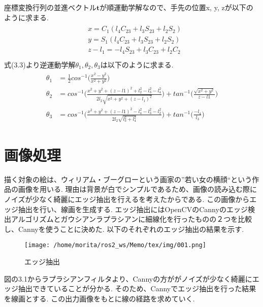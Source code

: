 	座標変換行列の並進ベクトル$\boldsymbol{t}$が順運動学解なので、手先の位置x, y, zが以下のように求まる.
	\begin{equation}
			\begin{array}{c}
			\begin{split}
				& x = C_1(l_4C_{23} + l_3S_{23} + l_2S_2) \\
				& y = S_1(l_4C_{23} + l_3S_{23} + l_2S_2) \\
				& z - l_1 = -l_4S_{23} + l_3C_{23} + l_2C_2 \\
			\end{split}
		\end{array}
	\end{equation}
	式(3.3)より逆運動学解$\theta_1, \theta_2, \theta_3$は以下のように求まる.
	\begin{equation}
			\begin{array}{c}
			\begin{split}
				\theta_1  &  =\frac{1}{2}  cos^{-1}\biggl( \frac{x^2-y^2}{x^2+y^2} \biggr) \\
				\theta_2 & = cos^{-1}\biggl( \frac{x^2+y^2+(z-l1)^2 + l_2^2-l_3^2-l_4^2}{2l_2\sqrt{x^2+y^2+(z-l_1)^2}} \biggr) + tan^{-1}\biggl( \frac{\sqrt{x^2+y^2}}{z-l1}\biggr) \\
				\theta_3 & =cos^{-1}\biggl( \frac{x^2+y^2+(z-l1)^2 - l_4^2-l_3^2-l_2^2}{2l_2\sqrt{l_3^2+l_4^2}}\biggr) + tan^{-1}\biggl( \frac{-l_4}{l_3}\biggr)
			\end{split}
			\end{array}
	\end{equation}
	\section{画像処理}
	描く対象の絵は、ウィリアム・ブーグローという画家の''若い女の横顔``という作品の画像を用いる. 理由は背景が白でシンプルであるため、画像の読み込む際にノイズが少なく綺麗にエッジ抽出を行えるを考えたからである. この画像からエッジ抽出を行い、線画を生成する. エッジ抽出にはOpenCVのCannyのエッジ検出アルゴリズムとガウシアンラプラシアンに細線化を行ったものの２つを比較し、Cannyを使うことに決めた. 以下のそれぞれのエッジ抽出の結果を示す. 
	 \begin{center}
        \begin{figure}[h]
            \texttt{[image: /home/morita/ros2\_ws/Memo/tex/img/001.png]}
            \caption{エッジ抽出}
            \label{manipulator}
        \end{figure}
    \end{center}
	図の3.1からラプラシアンフィルタより、Cannyの方ががノイズが少なく綺麗にエッジ抽出できていることが分かる. そのため、Cannyでエッジ抽出を行った結果を線画とする. この出力画像をもとに線の経路を求めていく.
